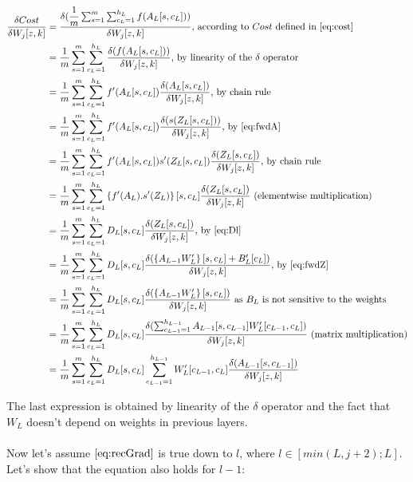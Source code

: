 \documentclass[]{article}
\begin{document}
\begin{align*}
\dfrac{\delta Cost}{\delta W_{j}[z,k]}&=\dfrac{\delta (\dfrac{1}{m}\sum_{s=1}^{m}\sum_{c_L=1}^{h_L}f(A_L[s,c_L]))}{\delta W_{j}[z,k]} \text{, according to $Cost$ defined in $\eqref{eq:cost}$}\\
&=\dfrac{1}{m}\sum_{s=1}^{m}\sum_{c_L=1}^{h_L}\dfrac{\delta (f(A_L[s,c_L]))}{\delta W_{j}[z,k]} \text{, by linearity of the $\delta$ operator}\\
&=\dfrac{1}{m}\sum_{s=1}^{m}\sum_{c_L=1}^{h_L}f'(A_L[s,c_L])\dfrac{\delta (A_L[s,c_L])}{\delta W_{j}[z,k]} \text{, by chain rule}\\
&=\dfrac{1}{m}\sum_{s=1}^{m}\sum_{c_L=1}^{h_L}f'(A_L[s,c_L])\dfrac{\delta (s(Z_L[s,c_L]))}{\delta W_{j}[z,k]} \text{, by $\eqref{eq:fwdA}$}\\
&=\dfrac{1}{m}\sum_{s=1}^{m}\sum_{c_L=1}^{h_L}f'(A_L[s,c_L]) s'(Z_L[s,c_L])\dfrac{\delta (Z_L[s,c_L])}{\delta W_{j}[z,k]} \text{, by chain rule}\\
&=\dfrac{1}{m}\sum_{s=1}^{m}\sum_{c_L=1}^{h_L} \left\lbrace f'(A_L) .  s'(Z_L)\right\rbrace [s,c_L]\dfrac{\delta (Z_L[s,c_L])}{\delta W_{j}[z,k]} \text{ (elementwise multiplication)} \\
&=\dfrac{1}{m}\sum_{s=1}^{m}\sum_{c_L=1}^{h_L} D_L [s,c_L]\dfrac{\delta (Z_L[s,c_L])}{\delta W_{j}[z,k]}  \text{, by $\eqref{eq:Dl}$}\\
&=\dfrac{1}{m}\sum_{s=1}^{m}\sum_{c_L=1}^{h_L} D_L [s,c_L]\dfrac{\delta (\left\lbrace A_{L-1}W_{L}'\right\rbrace [s,c_L]+B_{L}'[c_L] )}{\delta W_{j}[z,k]} \text{, by $\eqref{eq:fwdZ}$}\\
&=\dfrac{1}{m}\sum_{s=1}^{m}\sum_{c_L=1}^{h_L} D_L [s,c_L]\dfrac{\delta (\left\lbrace A_{L-1}W_{L}'\right\rbrace [s,c_L] )}{\delta W_{j}[z,k]} \text{ as $B_L$ is not sensitive to the weights}\\
&=\dfrac{1}{m}\sum_{s=1}^{m}\sum_{c_L=1}^{h_L}  D_L [s,c_L]\dfrac{\delta (\sum_{c_{L-1}=1}^{h_{L-1}} A_{L-1}[s,c_{L-1}]W_{L}' [c_{L-1},c_L] )}{\delta W_{j}[z,k]} \text{ (matrix multiplication)}\\
&=\dfrac{1}{m}\sum_{s=1}^{m}\sum_{c_L=1}^{h_L} D_L [s,c_L] \sum_{c_{L-1}=1}^{h_{L-1}}W_{L}' [c_{L-1},c_L] \dfrac{\delta ( A_{L-1}[s,c_{L-1}] )}{\delta W_{j}[z,k] } 
\end{align*}

The last expression is obtained by linearity of the $\delta$ operator and the fact that $W_L$ doesn't depend on weights in previous layers.\\
\\
Now let's assume $\eqref{eq:recGrad}$  is true down to $l$, where $l \in [min(L,j+2);L]$. \\
Let's show that the equation also holds for $l-1$:\\
\end{document}
